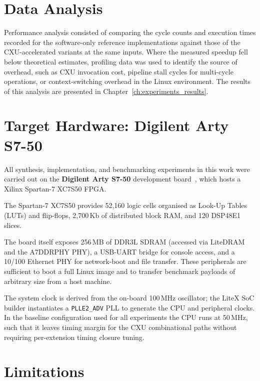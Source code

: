 \section{Data Analysis}
\label{sec:data_analysis}

Performance analysis consisted of comparing the cycle counts and execution times
recorded for the software-only reference implementations against those of the
CXU-accelerated variants at the same inputs.
Where the measured speedup fell below theoretical estimates, profiling data was used to
identify the source of overhead, such as CXU invocation cost, pipeline stall cycles for
multi-cycle operations, or context-switching overhead in the Linux environment.
The results of this analysis are presented in Chapter~\ref{ch:experiments_results}.

\section{Target Hardware: Digilent Arty S7-50}
\label{sec:target_hardware}

All synthesis, implementation, and benchmarking experiments in this work were carried
out on the \textbf{Digilent Arty S7-50} development board~\cite{DigilentArtyS7},
which hosts a Xilinx Spartan-7 XC7S50 FPGA.

The Spartan-7 XC7S50 provides 52{,}160 logic cells organised as Look-Up Tables (LUTs)
and flip-flops, 2{,}700\,Kb of distributed block RAM, and 120 DSP48E1 slices.

The board itself exposes 256\,MB of DDR3L SDRAM (accessed via LiteDRAM and the
A7DDRPHY PHY), a USB-UART bridge for console access, and a 10/100 Ethernet PHY
for network-boot and file transfer.
These peripherals are sufficient to boot a full Linux image and to transfer benchmark
payloads of arbitrary size from a host machine.

The system clock is derived from the on-board 100\,MHz oscillator; the LiteX SoC
builder instantiates a \texttt{PLLE2\_ADV} PLL to generate the CPU and peripheral
clocks.
In the baseline configuration used for all experiments the CPU runs at 50\,MHz,
such that it leaves timing margin for the CXU combinational
paths without requiring per-extension timing closure tuning.

\section{Limitations}
\label{sec:limitations_design}

